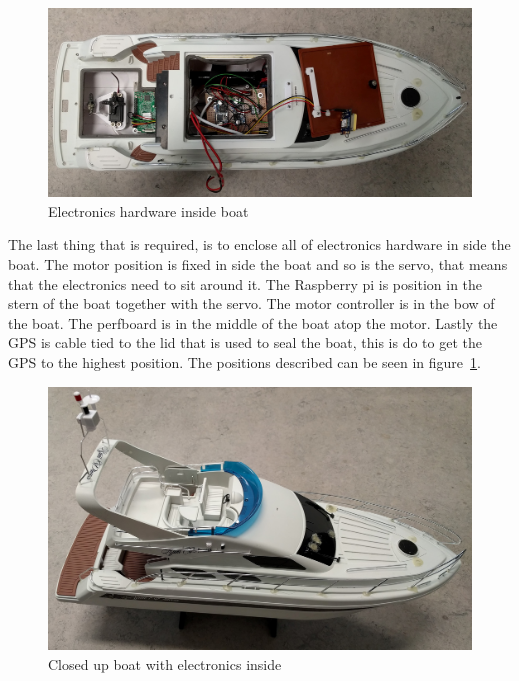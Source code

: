 \begin{figure}[H]
\centering
\includegraphics[width=0.7\linewidth]{Images/Implementation/all_hardware_in_boat}
\caption{Electronics hardware inside boat}
\label{fig:electronics_boat}
\end{figure}

The last thing that is required, is to enclose all of electronics hardware in side the boat. The motor position is fixed in side the boat and so is the servo, that means that the electronics need to sit around it. The Raspberry pi is position in the stern of the boat together with the servo. The motor controller is in the bow of the boat. The perfboard is in the middle of the boat atop the motor. Lastly the GPS is cable tied to the lid that is used to seal the boat, this is do to get the GPS to the highest position. The positions described can be seen in figure~\ref{fig:electronics_boat}.

\begin{figure}[H]
\centering
\includegraphics[width=0.7\linewidth]{Images/Implementation/boat_hardware_enclosed}
\caption{Closed up boat with electronics inside}
\label{fig:boat_closed}
\end{figure}












